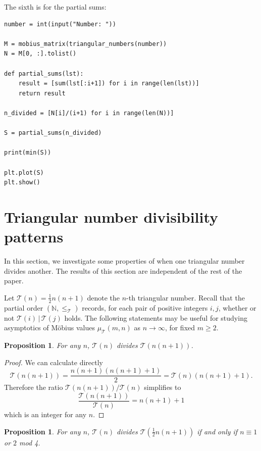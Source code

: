 \documentclass{amsart}
\newtheorem{prop}[thm]{Proposition}
\theoremstyle{definition}
\newcommand{\NN}{\mathbb{N}}
\newcommand{\Mobius}{M\"obius}
\newcommand{\leqtri}{\leq_{\tri}}
\newcommand{\mutri}{\mu_{\tri}}
\newcommand{\tri}{\mathcal T}
\newenvironment{graybox}
    {\begin{mdframed}[
    backgroundcolor=light-gray, 
    linecolor=light-gray,
    leftmargin=1, 
    rightmargin=1, 
    innerleftmargin=15, 
    innertopmargin=5,
    innerbottommargin=5, 
    outerlinewidth=1, 
    ]}
    {\end{mdframed}}
\begin{document}
\bigskip
The sixth is for the partial sums:

\begin{graybox}
    \begin{lstlisting}
number = int(input("Number: "))

M = mobius_matrix(triangular_numbers(number))
N = M[0, :].tolist()

def partial_sums(lst):
    result = [sum(lst[:i+1]) for i in range(len(lst))]
    return result

n_divided = [N[i]/(i+1) for i in range(len(N))]

S = partial_sums(n_divided)

print(min(S))

plt.plot(S)
plt.show()
    \end{lstlisting}
\end{graybox}

\section{Triangular number divisibility patterns}
\label{sec:triangular-patterns}

In this section, we investigate some properties of when one triangular number divides another.
The results of this section are independent of the rest of the paper.

\label{sec:zeta-patterns}
Let 
$\tri(n) = \frac12 n(n+1)$
denote the $n$-th triangular number.
Recall that the partial order $(\NN, \leqtri)$ records, for each pair of positive integers $i,j$, whether or not $\tri(i) \,|\, \tri(j)$ holds.
The following statements may be useful for studying asymptotics of \Mobius{} values $\mutri(m,n)$ as $n\to \infty$, for fixed $m\geq 2$.

\begin{prop}
For any $n$, $\tri(n)$ divides $\tri(n(n+1))$.
\end{prop}

\begin{proof}
We can calculate directly
\[
    \tri({n(n+1)}) = \frac{n(n+1)(n(n+1)+1)}{2} = \tri(n) (n(n+1) + 1).
\]
Therefore the ratio $\tri(n(n+1)) / \tri(n)$ simplifies to
\[
    \frac{\tri(n(n+1))}{\tri(n)} = n(n+1) + 1 
\]
which is an integer for any $n$.
\end{proof}

\begin{prop}
\label{prop:2}
For any $n$, $\tri(n)$ divides $\tri( \frac12 n(n+1) )$ if and only if 
$n \equiv 1$ or $2$ mod 4.
\end{prop}
\end{document}
